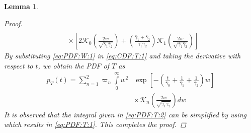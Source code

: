 \documentclass[conference]{IEEEtran}
\newtheorem{lemma}{Lemma}
\newcommand{\PDF}[2]{p_{{#1}}\left({#2}\right)}
\newcommand{\Bessel}[2]{\mathcal{K}_{{#1}}\left({#2}\right)}
\newcommand{\snravei}[1]{\bar\gamma_{#1}}
\begin{document}
\begin{lemma}
\begin{proof}
\begin{align}
    \nonumber
    \\
    &\times
    \left[
    2\Bessel{0}{\frac{2w}{\sqrt{\snravei{1}\snravei{2}}}}
    +
    \left(\frac{\snravei{1}+\snravei{2}}{\snravei{1}\snravei{2}}\right)
    \Bessel{1}{\frac{2w}{\sqrt{\snravei{1}\snravei{2}}}}
    \right]
\end{align}
%
%
By substituting \eqref{eq:PDF:W:1} in \eqref{eq:CDF:T:1} and taking
the derivative with respect to $t$, we obtain the PDF of $T$ as
%
%
\begin{align} \label{eq:PDF:T:2}
    \PDF{T}{t}
    =
    \sum\limits_{n=1}^{2}
    \varpi_n
    \int\limits_{0}^{\infty}
    w^2
    &\exp\left[-\left(\frac{t}{\snravei{0}}+\frac{1}{\snravei{1}}+\frac{1}{\snravei{2}}\right)w\right]
    \nonumber
    \\
    &\times
    \Bessel{n}{\frac{2w}{\sqrt{\snravei{1}\snravei{2}}}}
    dw
\end{align}
%
%
It is observed that the integral given in \eqref{eq:PDF:T:2} can be
simplified by using \cite[eq.~(6.621.3)]{Prudnikov:90:Book} which
results in \eqref{eq:PDF:T:1}. This completes the proof.
\end{proof}
\end{lemma}



\end{document}
